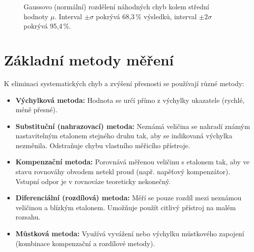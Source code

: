 \begin{figure}[h]
\centering
{}
\caption{Gaussovo (normální) rozdělení náhodných chyb kolem střední hodnoty $\mu$. Interval $\pm\sigma$ pokrývá 68{,}3\,\% výsledků, interval $\pm 2\sigma$ pokrývá 95{,}4\,\%.}
\label{fig:gauss}
\end{figure}

\section{Základní metody měření}
K eliminaci systematických chyb a zvýšení přesnosti se používají různé metody:
\begin{itemize}
    \item \textbf{Výchylková metoda:} Hodnota se určí přímo z výchylky ukazatele (rychlé, méně přesné).
    \item \textbf{Substituční (nahrazovací) metoda:} Neznámá veličina se nahradí známým nastavitelným etalonem stejného druhu tak, aby se indikovaná výchylka nezměnila. Odstraňuje chybu vlastního měřicího přístroje.
    \item \textbf{Kompenzační metoda:} Porovnává měřenou veličinu s etalonem tak, aby ve stavu rovnováhy obvodem netekl proud (např. napěťový kompenzátor). Vstupní odpor je v rovnováze teoreticky nekonečný.
    \item \textbf{Diferenciální (rozdílová) metoda:} Měří se pouze rozdíl mezi neznámou veličinou a blízkým etalonem. Umožňuje použít citlivý přístroj na malém rozsahu.
    \item \textbf{Můstková metoda:} Využívá vyvážení nebo výchylku můstkového zapojení (kombinace kompenzační a rozdílové metody).
\end{itemize}

